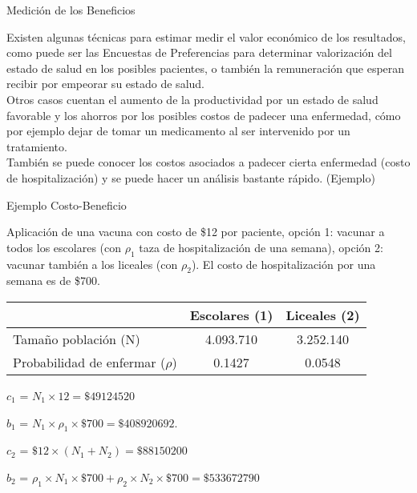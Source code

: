 \documentclass[xcolor=dvipsnames]{beamer}
\begin{document}
    \begin{frame}{Medición de los Beneficios}

    Existen algunas técnicas para estimar medir el valor económico de los resultados, como puede ser las Encuestas de Preferencias para determinar valorización del estado de salud en los posibles pacientes, o también la remuneración que esperan recibir por empeorar su estado de salud.\\
    
    Otros casos cuentan el aumento de la productividad por un estado de salud favorable y los ahorros por los posibles costos de padecer una enfermedad, cómo por ejemplo dejar de tomar un medicamento al ser intervenido por un tratamiento.\\

    También se puede conocer los costos asociados a padecer cierta enfermedad (costo de hospitalización) y se puede hacer un análisis bastante rápido. (Ejemplo)
    
    \end{frame}

    \begin{frame}{Ejemplo Costo-Beneficio}

    Aplicación de una vacuna con costo de \$12 por paciente, opción 1: vacunar a todos los escolares (con $\rho_1$ taza de hospitalización de una semana), opción 2: vacunar también a los liceales (con $\rho_2$). El costo de hospitalización por una semana es de \$700.

    \begin{table}[ht]
\centering
\begin{tabular}{lcc}
  \hline
 & Escolares (1) & Liceales (2) \\ 
  \hline
Tamaño población (N) & 4.093.710 & 3.252.140 \\ 
  Probabilidad de enfermar ($\rho$) & 0.1427 & 0.0548 \\ 
 \hline
\end{tabular}
\end{table}

\item $c_1$ = $N_1 \times 12 = \$49124520$
\item $b_1$ = $N_1 \times \rho_1 \times \$700 = \$408920692$.

\item $c_2$ = $\$12 \times (N_1+N_2)=\$88150200$
\item $b_2$ = $\rho_1 \times N_1 \times \$700 + \rho_2 \times N_2 \times\$700=\$533672790 $
    \end{frame}
\end{document}
